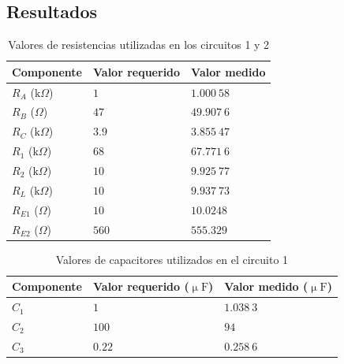 \documentclass[journal]{IEEEtran}
\begin{document}
\vspace{1cm}


\subsection{Resultados}

\begin{table}[H]
        \centering
        \renewcommand{\arraystretch}{1.5}
        \caption{Valores de resistencias utilizadas en los circuitos 1 y 2}
        \begin{tabular}{ >{\centering\arraybackslash}m{2.5cm} >{\centering\arraybackslash}m{2.5cm} >{\centering\arraybackslash}m{2.5cm} }
                \hline
            \centering
            Componente & Valor requerido & Valor medido\\ 
            \hline
            \centering
            $R_A$ ($\mathrm{k}\Omega$) & $1$  & $1.000~58$  \\ 
            $R_B$ ($\Omega$) & $47$  & $49.907~6$  \\
            $R_C$ ($\mathrm{k}\Omega$) & $3.9$  & $3.855~47$  \\
            $R_1$ ($\mathrm{k}\Omega$) & $68$  & $67.771~6$ \\
            $R_2$ ($\mathrm{k}\Omega$) & $10$  & $9.925~77$ \\
            $R_L$ ($\mathrm{k}\Omega$) & $10$  & $9.937~73$ \\
            $R_{E1}$ ($\Omega$) & $10$  & $10.0248$ \\
            $R_{E2}$ ($\Omega$) & $560$  & $555.329$ \\
            \hline
        \end{tabular}
        \label{tabla1}
    \end{table}
    
\begin{table}[H]
        \centering
        \renewcommand{\arraystretch}{1.5}
        \caption{Valores de capacitores utilizados en el circuito 1}
        \begin{tabular}{ >{\centering\arraybackslash}m{2.5cm} >{\centering\arraybackslash}m{2.5cm} >{\centering\arraybackslash}m{2.5cm} }
                \hline
            Componente & Valor requerido ($\upmu\mathrm{F}$) & Valor medido ($\upmu\mathrm{F}$)\\ 
            \hline
            \centering
            $C_1$ & $1$  & $1.038~3$  \\ 
            $C_2$ & $100$  & $94$ \\
            $C_3$ & $0.22$  & $0.258~6$ \\
            \hline
        \end{tabular}
        \label{tabla2}
    \end{table}    
\end{document}
